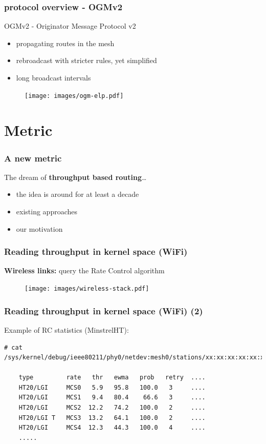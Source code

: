 \documentclass[slidestop]{beamer}
\begin{document}
\begin{frame}[c]
	\frametitle{protocol overview - OGMv2}

	OGMv2 - Originator Message Protocol v2
	\begin{itemize}
		\item propagating routes in the mesh
		\item rebroadcast with stricter rules, yet simplified
		\item long broadcast intervals
	\end{itemize}

	\begin{figure}
		\centering
		\texttt{[image: images/ogm-elp.pdf]}
	\end{figure}
\end{frame}

\section{Metric}
\begin{frame}[c]
	\frametitle{A new metric}
	\begin{center}
		The dream of \textbf{throughput based routing}\dots\\[1cm]
		\begin{itemize}
			\item the idea is around for at least a decade
			\item existing approaches
			\item our motivation
		\end{itemize}
	\end{center}
\end{frame}

\begin{frame}[c]
	\frametitle{Reading throughput in kernel space (WiFi)}
	\textbf{Wireless links:} query the Rate Control algorithm
	\vfill
	\begin{figure}
		\centering
		\texttt{[image: images/wireless-stack.pdf]}
	\end{figure}
\end{frame}

\begin{frame}[c,fragile]
	\frametitle{Reading throughput in kernel space (WiFi) (2)}
	Example of RC statistics (MinstrelHT):
	\begin{lstlisting}[basicstyle=\tiny]
	# cat /sys/kernel/debug/ieee80211/phy0/netdev:mesh0/stations/xx:xx:xx:xx:xx:xx/rc_stats

	type         rate   thr   ewma   prob   retry  ....
	HT20/LGI     MCS0   5.9   95.8   100.0   3     ....
	HT20/LGI     MCS1   9.4   80.4    66.6   3     ....
	HT20/LGI     MCS2  12.2   74.2   100.0   2     ....
	HT20/LGI T   MCS3  13.2   64.1   100.0   2     ....
	HT20/LGI     MCS4  12.3   44.3   100.0   4     ....
	.....
	\end{lstlisting}
\end{frame}
\end{document}
